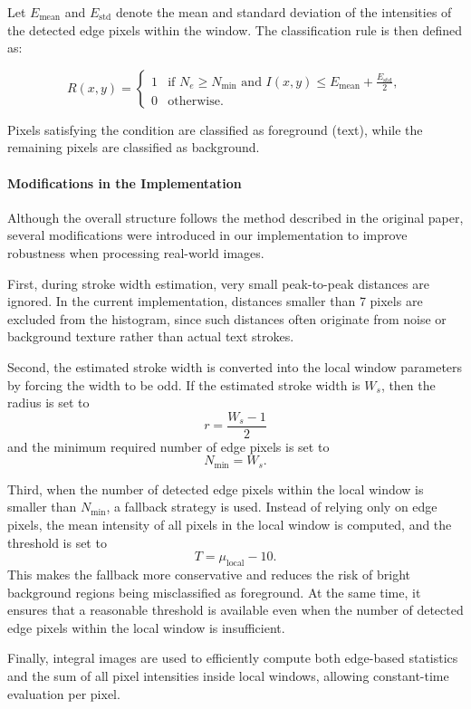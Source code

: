 Let $E_{\text{mean}}$ and $E_{\text{std}}$ denote the mean and
standard deviation of the intensities of the detected edge pixels
within the window. The classification rule is then defined as:

\[
R(x,y) =
\begin{cases}
1 & \text{if } N_e \ge N_{\min}
      \text{ and }
      I(x,y) \le E_{\text{mean}} + \frac{E_{\text{std}}}{2}, \\
0 & \text{otherwise}.
\end{cases}
\]

Pixels satisfying the condition are classified as foreground
(text), while the remaining pixels are classified as background.

\paragraph{Modifications in the Implementation}

Although the overall structure follows the method described in the
original paper, several modifications were introduced in our
implementation to improve robustness when processing real-world
images.

First, during stroke width estimation, very small peak-to-peak distances are ignored. 
In the current implementation, distances smaller than 7 pixels are excluded from the 
histogram, since such distances often originate from noise or background texture 
rather than actual text strokes.

Second, the estimated stroke width is converted into the local window parameters 
by forcing the width to be odd. If the estimated stroke width is $W_s$, then the 
radius is set to
\[
r = \frac{W_s - 1}{2}
\]
and the minimum required number of edge pixels is set to
\[
N_{\min} = W_s.
\]

Third, when the number of detected edge pixels within the local window is smaller 
than $N_{\min}$, a fallback strategy is used. Instead of relying only on edge pixels, 
the mean intensity of all pixels in the local window is computed, and the threshold 
is set to
\[
T = \mu_{\text{local}} - 10.
\]
This makes the fallback more conservative and reduces the risk of
bright background regions being misclassified as foreground.
At the same time, it ensures that a reasonable threshold is available
even when the number of detected edge pixels within the local window
is insufficient.

Finally, integral images are used to efficiently compute both edge-based statistics 
and the sum of all pixel intensities inside local windows, allowing constant-time 
evaluation per pixel.


